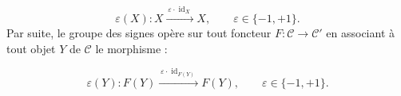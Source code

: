 \begin{equation}
  \varepsilon(X)\colon
  X\xrightarrow{\,\varepsilon\cdot\operatorname{id}_X\,}X,
  \qquad \varepsilon\in\{-1,+1\}.
  \tag{1.4.3.1}
\end{equation}
Par suite, le groupe des signes opère sur tout foncteur
$F\colon\mathcal C\to\mathcal C'$ en associant à tout objet $Y$ de
$\mathcal C$ le morphisme :

\begin{equation}
  \varepsilon(Y)\colon
  F(Y)\xrightarrow{\,\varepsilon\cdot\operatorname{id}_{F(Y)}\,}F(Y),
  \qquad \varepsilon\in\{-1,+1\}.
  \tag{1.4.3.2}
\end{equation}
